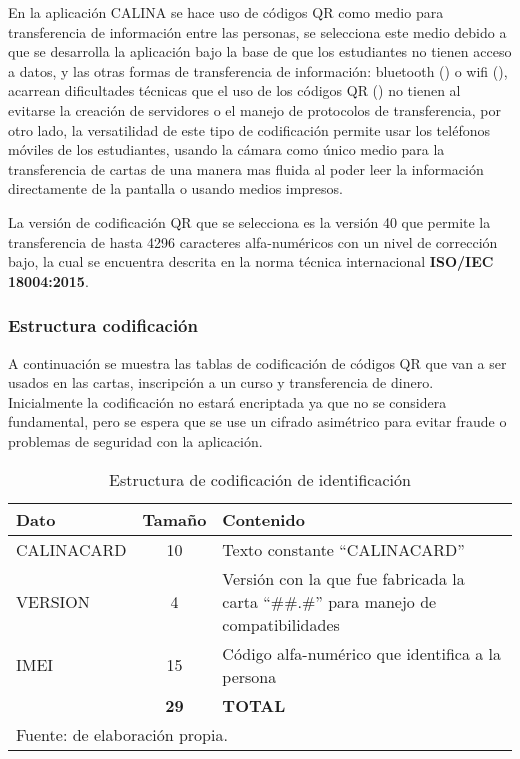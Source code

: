 En la aplicación CALINA se hace uso de códigos QR como medio para transferencia de información entre las 
personas, se selecciona este medio debido a que se desarrolla la aplicación bajo la base de que los 
estudiantes no tienen acceso a datos, y las otras formas de transferencia de información: bluetooth 
(\faBluetoothB) o wifi (\faWifi), acarrean dificultades técnicas que el uso de los códigos QR (\faQrcode) no 
tienen al evitarse la creación de servidores o el manejo de protocolos de transferencia, por otro lado, la 
versatilidad de este tipo de codificación permite usar los teléfonos móviles de los estudiantes, usando la 
cámara como único medio para la transferencia de cartas de una manera mas fluida al poder leer la información 
directamente de la pantalla o usando medios impresos.

La versión de codificación QR que se selecciona es la versión 40 que permite la transferencia de hasta 4296 
caracteres alfa-numéricos con un nivel de corrección bajo, la cual se encuentra descrita en la norma técnica 
internacional \textbf{ISO/IEC 18004:2015}.

\subsubsection{Estructura codificación}

A continuación se muestra las tablas de codificación de códigos QR que van a ser usados en las cartas, 
inscripción a un curso y transferencia de dinero. Inicialmente la codificación no estará encriptada ya que no 
se considera fundamental, pero se espera que se use un cifrado asimétrico para evitar fraude o problemas de 
seguridad con la aplicación.

\begin{table}[!htb]
\caption{Estructura de codificación de identificación}
\label{tab:codificacionid}
\begin{center}
\footnotesize
\begin{tabular}{ p{40mm} c p{100mm}}
\toprule
\textbf{Dato} & \textbf{Tamaño} & \textbf{Contenido}\\ 
\midrule
CALINACARD & 10 & Texto constante ``CALINACARD''\\
\midrule
VERSION & 4 & Versión con la que fue fabricada la carta ``\#\#.\#'' para manejo de compatibilidades\\
\midrule
IMEI & 15 & Código alfa-numérico que identifica a la persona\\
\bottomrule
& \textbf{29} & \textbf{TOTAL}\\
\bottomrule
\multicolumn{3}{l}{\footnotesize Fuente: de elaboración propia.}\\
\end{tabular}
\end{center}
\end{table}

